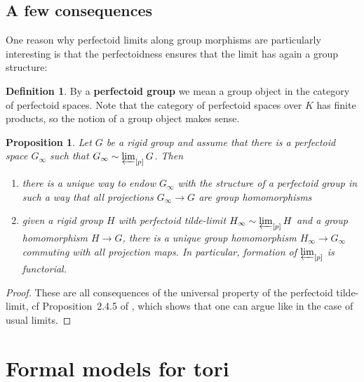 \documentclass[10pt,oneside]{amsart}
\newtheorem{proposition}[theorem]{Proposition}
\theoremstyle{definition}
\newtheorem{definition}[theorem]{Definition}
\begin{document}
 
 
	
 
	
		
	\subsection{A few consequences}
	
	One reason why perfectoid limits along group morphisms are particularly interesting is that the perfectoidness ensures that the limit has again a group structure:
	
	\begin{definition}
		By a \textbf{perfectoid group} we mean a group object in the category of perfectoid spaces.
		Note that the category of perfectoid spaces over $K$ has finite products, so the notion of a group object makes sense. 
	\end{definition}
	
	\begin{proposition}\label{perfectoid tilde limit is perfectoid group in a functorial way}
		Let $G$ be a rigid group and assume that there is a perfectoid space $G_\infty$ such that $G_\infty \sim \varprojlim_{[p]} G$. Then
		\begin{enumerate}
		\item  there is a unique way to endow $G_\infty$ with the structure of a perfectoid group in such a way that all projections $G_\infty\rightarrow G$ are group homomorphisms
		\item given a rigid group $H$ with perfectoid tilde-limit $H_\infty\sim\varprojlim_{[p]}H$ and a group homomorphism $H\rightarrow G$, there is a unique group homomorphism $H_\infty\rightarrow G_\infty$
		commuting with all projection maps. In particular, formation of $\varprojlim_{[p]}$ is functorial.
	\end{enumerate}
	\end{proposition}
	\begin{proof}
		These are all consequences of the universal property of the perfectoid tilde-limit, cf Proposition~2.4.5 of \cite{SW}, which shows that one can argue like in the case of usual limits.
	\end{proof}


 
 
	\section{Formal models for tori}
	
\end{document}
